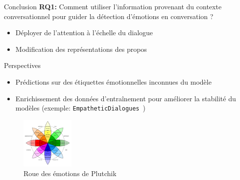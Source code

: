 \documentclass[11pt,aspectratio=169]{beamer}
\begin{document}
\begin{frame}{Conclusion}
\textcolor{roose}{\bf RQ1:} Comment utiliser l'information provenant du contexte conversationnel pour guider la détection d'émotions en conversation ?
    \begin{itemize}
        \item Déployer de l'attention à l'échelle du dialogue
        \item Modification des représentations des propos
    \end{itemize}
\vspace{10pt}
\end{frame}

\begin{frame}{Perspectives}
    \begin{itemize}
        \item Prédictions sur des étiquettes émotionnelles inconnues du modèle
        \item Enrichissement des données d'entraînement pour améliorer la stabilité du modèles (exemple: \texttt{EmpatheticDialogues}~) 
    \end{itemize}
    \begin{figure}
        \centering
        \includegraphics[width=0.23\textwidth]{emotion_wheel.png}
        \caption{\centering Roue des émotions de Plutchik~}
    \end{figure}
\end{frame}
\end{document}
